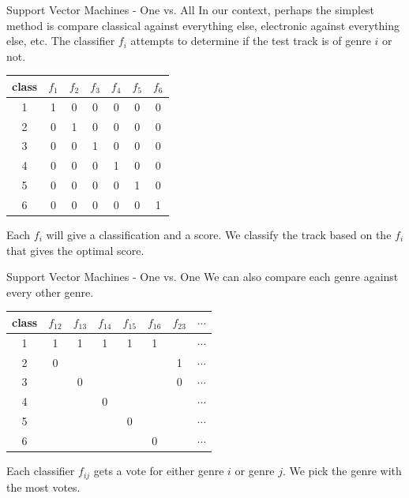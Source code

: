 \documentclass[xcolor=dvipsnames,t]{beamer} %
\begin{document}
\begin{frame}{Support Vector Machines - One vs. All}
   In our context, perhaps the simplest method is compare classical against everything else, electronic against everything else, etc.  The classifier $f_i$ attempts to determine if the test track is of genre $i$ or not.

\begin{table}
   \centering
   \begin{tabular}{|c|cccccc|}
      \hline
      class&$f_1$ & $f_2$ & $f_3$ & $f_4$ & $f_5$ & $f_6$\\\hline
      1 & 1 & 0 & 0 & 0 &0 &0\\\hline
      2 & 0 & 1 & 0 & 0 & 0 & 0\\\hline
      3 & 0 & 0 & 1 & 0 & 0 & 0\\\hline
      4 & 0 & 0 & 0 & 1 & 0 & 0\\\hline
      5 & 0 & 0 & 0 & 0 & 1 & 0\\\hline
      6 & 0 & 0 & 0 & 0 & 0 & 1\\\hline
   \end{tabular}
\end{table}

   Each $f_i$ will give a classification and a score.  We classify the track based on the $f_i$ that gives the optimal score.

\end{frame}

\begin{frame}{Support Vector Machines - One vs. One}
   We can also compare each genre against every other genre.

\begin{table}
   \centering
   \begin{tabular}{|c|ccccccc|}
      \hline
      class&$f_{12}$ & $f_{13}$ & $f_{14}$ & $f_{15}$ & $f_{16}$ & $f_{23}$ & $\cdots$ \\\hline
      1 & 1 & 1 & 1 & 1 & 1 &   & $\cdots$ \\\hline
      2 & 0 &   &   &   &   & 1 & $\cdots$ \\\hline
      3 &   & 0 &   &   &   & 0 & $\cdots$ \\\hline
      4 &   &   & 0 &   &   &   & $\cdots$ \\\hline
      5 &   &   &   & 0 &   &   & $\cdots$ \\\hline
      6 &   &   &   &   & 0 &   & $\cdots$ \\\hline
   \end{tabular}
\end{table}
   
   Each classifier $f_{ij}$ gets a vote for either genre $i$ or genre $j$.  We pick the genre with the most votes.

\end{frame}
\end{document}
